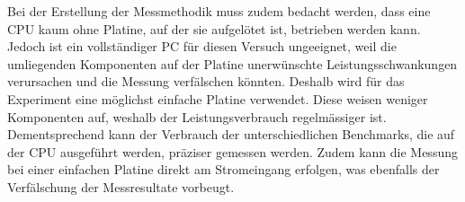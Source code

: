\par

Bei der Erstellung der Messmethodik muss zudem bedacht werden, dass eine CPU kaum ohne Platine, auf der sie aufgelötet ist, betrieben werden kann. Jedoch ist ein vollständiger PC für diesen Versuch ungeeignet, weil die umliegenden Komponenten auf der Platine unerwünschte Leistungsschwankungen verursachen und die Messung verfälschen könnten. Deshalb wird für das Experiment eine möglichst einfache Platine verwendet. Diese weisen weniger Komponenten auf, weshalb der Leistungsverbrauch regelmässiger ist. Dementsprechend kann der Verbrauch der unterschiedlichen Benchmarks, die auf der CPU ausgeführt werden, präziser gemessen werden. Zudem kann die Messung bei einer einfachen Platine direkt am Stromeingang erfolgen, was ebenfalls der Verfälschung der Messresultate vorbeugt.
